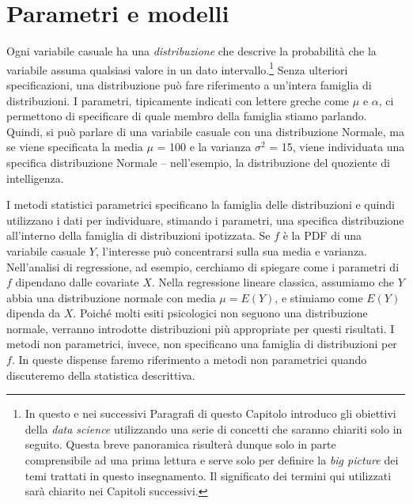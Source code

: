 \documentclass[
  11pt,
]{krantz}
\theoremstyle{definition}
\theoremstyle{definition}
\theoremstyle{definition}
\theoremstyle{definition}
\theoremstyle{remark}
\begin{document}
\hypertarget{parametri-e-modelli}{%
\section{Parametri e modelli}\label{parametri-e-modelli}}

Ogni variabile casuale ha una \emph{distribuzione} che descrive la probabilità che la variabile assuma qualsiasi valore in un dato intervallo.\footnote{In questo e nei successivi Paragrafi di questo Capitolo introduco gli obiettivi della \emph{data science} utilizzando una serie di concetti che saranno chiariti solo in seguito. Questa breve panoramica risulterà dunque solo in parte comprensibile ad una prima lettura e serve solo per definire la \emph{big picture} dei temi trattati in questo insegnamento. Il significato dei termini qui utilizzati sarà chiarito nei Capitoli successivi.} Senza ulteriori specificazioni, una distribuzione può fare riferimento a un'intera famiglia di distribuzioni. I parametri, tipicamente indicati con lettere greche come \(\mu\) e \(\alpha\), ci permettono di specificare di quale membro della famiglia stiamo parlando. Quindi, si può parlare di una variabile casuale con una distribuzione Normale, ma se viene specificata la media \(\mu\) = 100 e la varianza \(\sigma^2\) = 15, viene individuata una specifica distribuzione Normale -- nell'esempio, la distribuzione del quoziente di intelligenza.

I metodi statistici parametrici specificano la famiglia delle distribuzioni e quindi utilizzano i dati per individuare, stimando i parametri, una specifica distribuzione all'interno della famiglia di distribuzioni ipotizzata. Se \(f\) è la PDF di una variabile casuale \(Y\), l'interesse può concentrarsi sulla sua media e varianza. Nell'analisi di regressione, ad esempio, cerchiamo di spiegare come i parametri di \(f\) dipendano dalle covariate \(X\). Nella regressione lineare classica, assumiamo che \(Y\) abbia una distribuzione normale con media \(\mu = E(Y)\), e stimiamo come \(E(Y)\) dipenda da \(X\). Poiché molti esiti psicologici non seguono una distribuzione normale, verranno introdotte distribuzioni più appropriate per questi risultati. I metodi non parametrici, invece, non specificano una famiglia di distribuzioni per \(f\). In queste dispense faremo riferimento a metodi non parametrici quando discuteremo della statistica descrittiva.
\end{document}
